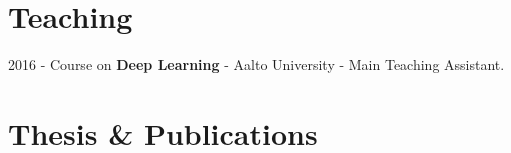 \documentclass[]{deedy-resume}
\begin{document}
\begin{minipage}[t]{0.66\textwidth}
\sectionsep

\sectionsep


\section{Teaching} 
\vspace{\topsep} %
\begin{tightemize}
\item 2016 - Course on \textbf{Deep Learning} - Aalto University - Main Teaching Assistant. 
\end{tightemize}




\section{Thesis \& Publications} 
\renewcommand\refname{\vskip -1.5cm} %


\nocite{*}



\end{minipage}
\end{document}
